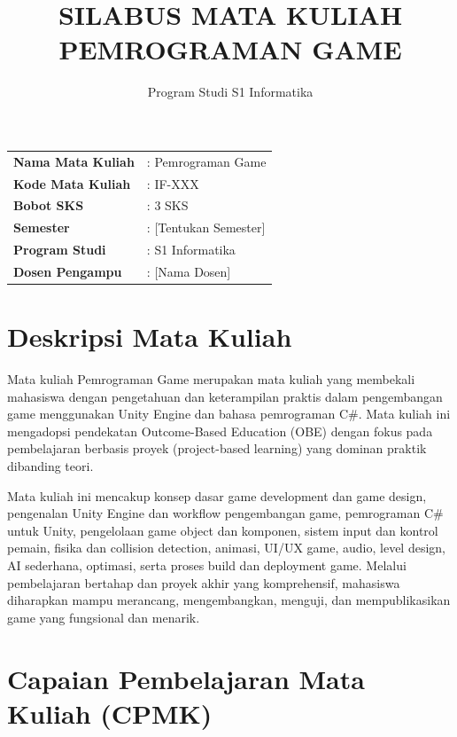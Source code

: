 \documentclass[a4paper,12pt]{article}
\title{\textbf{SILABUS MATA KULIAH}\\
\textbf{PEMROGRAMAN GAME}}
\author{Program Studi S1 Informatika}
\date{}
\begin{document}
\maketitle

\vspace{1cm}

\begin{table}[h]
\centering
\begin{tabular}{ll}
\textbf{Nama Mata Kuliah} & : Pemrograman Game \\
\textbf{Kode Mata Kuliah} & : IF-XXX \\
\textbf{Bobot SKS} & : 3 SKS \\
\textbf{Semester} & : [Tentukan Semester] \\
\textbf{Program Studi} & : S1 Informatika \\
\textbf{Dosen Pengampu} & : [Nama Dosen] \\
\end{tabular}
\end{table}

\newpage

\section{Deskripsi Mata Kuliah}

Mata kuliah Pemrograman Game merupakan mata kuliah yang membekali mahasiswa dengan pengetahuan dan keterampilan praktis dalam pengembangan game menggunakan Unity Engine dan bahasa pemrograman C\#. Mata kuliah ini mengadopsi pendekatan Outcome-Based Education (OBE) dengan fokus pada pembelajaran berbasis proyek (project-based learning) yang dominan praktik dibanding teori.

Mata kuliah ini mencakup konsep dasar game development dan game design, pengenalan Unity Engine dan workflow pengembangan game, pemrograman C\# untuk Unity, pengelolaan game object dan komponen, sistem input dan kontrol pemain, fisika dan collision detection, animasi, UI/UX game, audio, level design, AI sederhana, optimasi, serta proses build dan deployment game. Melalui pembelajaran bertahap dan proyek akhir yang komprehensif, mahasiswa diharapkan mampu merancang, mengembangkan, menguji, dan mempublikasikan game yang fungsional dan menarik.

\section{Capaian Pembelajaran Mata Kuliah (CPMK)}
\end{document}
